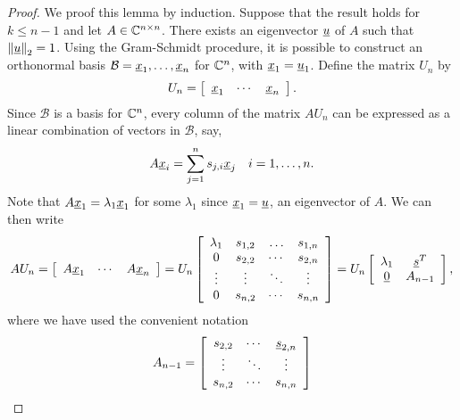 \begin{proof}
We proof this lemma by induction.
Suppose that the result holds for $k \leq n-1$ and let $A \in \mathbb{C}^{n \times n}$.
There exists an eigenvector $\underline{u}$ of $A$ such that $\left\| \underline{u} \right\|_2 = 1$.
Using the Gram-Schmidt procedure, it is possible to construct an orthonormal basis $\mathcal{B} = \underline{x}_1, \ldots, \underline{x}_n$ for $\mathbb{C}^n$, with $\underline{x}_1 = \underline{u}_1$.
Define the matrix $U_n$ by
\begin{equation*}
U_n = \left[ \begin{array}{ccc} \underline{x}_1 & \cdots & \underline{x}_n \end{array} \right] .
\end{equation*}
Since $\mathcal{B}$ is a basis for $\mathbb{C}^n$, every column of the matrix $AU_n$ can be expressed as a linear combination of vectors in $\mathcal{B}$, say,
\begin{equation*}
A \underline{x}_i = \sum_{j=1}^n s_{j,i} \underline{x}_j
\quad i = 1, \ldots, n .
\end{equation*}
Note that $A \underline{x}_1 = \lambda_1 \underline{x}_1$ for some $\lambda_1$ since $\underline{x}_1 = \underline{u}$, an eigenvector of $A$.
We can then write
\begin{equation*}
A U_n = \left[ \begin{array}{ccc} A \underline{x}_1 & \cdots & A \underline{x}_n \end{array} \right]
= U_n \left[ \begin{array}{cccc} \lambda_1 & s_{1,2} & \ldots & s_{1,n} \\
0 & s_{2,2} & \cdots & s_{2,n} \\
\vdots & \vdots & \ddots & \vdots \\
0 & s_{n,2} & \cdots & s_{n,n} \end{array} \right]
= U_n \left[ \begin{array}{cc} \lambda_1 & \underline{s}^T \\
\underline{0} & A_{n-1} \end{array} \right] ,
\end{equation*}
where we have used the convenient notation
\begin{equation*}
A_{n-1} = \left[ \begin{array}{ccc} s_{2,2} & \cdots & \vecnot{s}_{2,n} \\
\vdots & \ddots & \vdots \\
s_{n,2} & \cdots & s_{n,n} \end{array} \right]

\end{equation*}
\end{proof}
